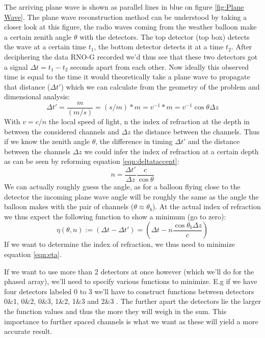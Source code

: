 The arriving plane wave is shown as parallel lines in blue on figure \ref{fig:Plane Wave}. The
plane wave reconstruction method can be understood by taking a closer look at this figure, 
the radio waves coming from the weather balloon make a certain zenith angle $\theta$ with the detectors. The top detector (top box)
detects the wave at a certain time $t_1$, the bottom detector detects it at a
time $t_2$. After deciphering the data RNO-G recorded we'd thus see that these
two detectors got a signal $\Delta t = t_1 - t_2$ seconds apart from each other.
Now ideally this observed time is equal to the time it would theoretically take a plane
wave to propagate that distance ($\Delta t'$) which we can calculate from the geometry of
the problem and dimensional analysis:
\begin{equation}
	\Delta t' = \frac{m}{(m/s)} = (s/m)*m = v^{-1} * m = v^{-1} \cos\theta \Delta z
	\label{eqn:deltataccent}
\end{equation}
With $v = c/n$ the local speed of light, n the index of refraction at the depth in between
the considered channels and $\Delta z$ the distance between the channels. 
Thus if we know the zenith angle $\theta$, the difference in timing $\Delta t'$ and the distance between the channels $\Delta z$
we could infer the index of refraction at a certain depth as can be seen by reforming equation \ref{eqn:deltataccent}:
\begin{equation}
	n = \frac{\Delta t'}{\Delta z} \frac{c}{\cos\theta}
\end{equation}
We can actually roughly guess the angle, as for a balloon flying close to the
detector the incoming plane wave angle will be roughly the same as the angle the balloon
makes with the pair of channels ($\theta\approx\theta_b$).
At the actual index of refraction we thus expect the following function to show a 
minimum (go to zero):
\begin{equation}
	\eta(\theta,n) := (\Delta t - \Delta t') = \left(\Delta t
	- n\frac{\cos\theta_b \Delta z}{c}\right)
  	\label{eqn:eta}
\end{equation}
If we want to determine the index of refraction, 
we thus need to minimize equation \ref{eqn:eta}.

If we want to use more than 2 detectors at once however (which we'll
do for the phased array), we'll need to specify various functions to
minimize.  E.g if we have four detectors labeled 0 to 3 we'll have
to construct functions between detectors 0\&1, 0\&2, 0\&3, 1\&2,
1\&3 and 2\&3 . The further apart the detectors lie the larger the
function values and thus the more they will weigh in the sum. This importance to
further spaced channels is what we want as these will yield a more
accurate result. 
